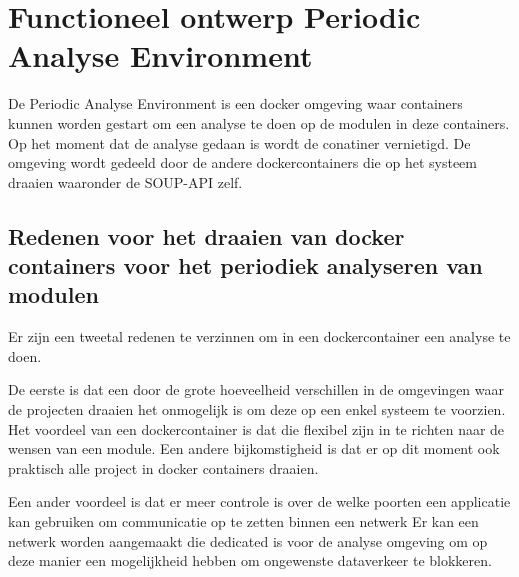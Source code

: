 \chapter{Functioneel ontwerp Periodic Analyse Environment}\label{ch:impl-scan containers}
De Periodic Analyse Environment is een docker omgeving waar containers kunnen worden gestart om een analyse te doen op de modulen in deze containers. Op het moment dat de analyse gedaan is wordt de conatiner vernietigd. De omgeving wordt gedeeld door de andere dockercontainers die op het systeem draaien waaronder de SOUP-API zelf.


\section{Redenen voor het draaien van docker containers voor het periodiek analyseren van modulen}
Er zijn een tweetal redenen te verzinnen om in een dockercontainer een analyse te doen.

De eerste is dat een door de grote hoeveelheid verschillen in de omgevingen waar de projecten draaien het onmogelijk is om deze op een enkel systeem te voorzien. Het voordeel van een dockercontainer is dat die flexibel zijn in te richten naar de wensen van een module. Een andere bijkomstigheid is dat er op dit moment ook praktisch alle project in docker containers draaien.

Een ander voordeel is dat er meer controle is over de welke poorten een applicatie kan gebruiken om communicatie op te zetten binnen een netwerk Er kan een netwerk worden aangemaakt die dedicated is voor de analyse omgeving om op deze manier een mogelijkheid hebben om ongewenste dataverkeer te blokkeren.


